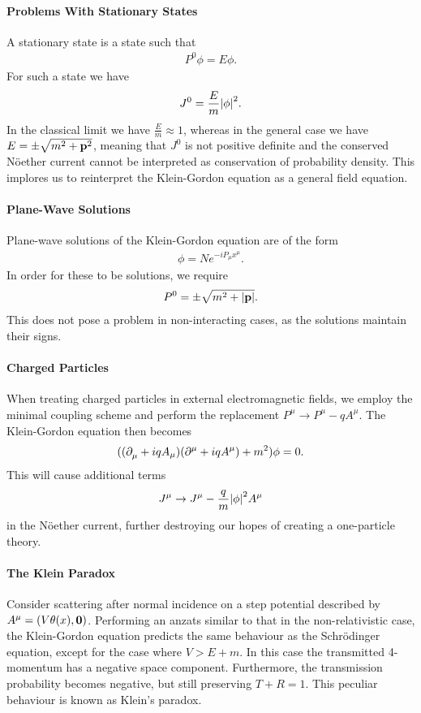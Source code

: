 \paragraph{Problems With Stationary States}
A stationary state is a state such that
\begin{align*}
	P^{0}\phi = E\phi.
\end{align*}
For such a state we have
\begin{align*}
	J^{0} = \frac{E}{m}\abs{\phi}^{2}.
\end{align*}
In the classical limit we have $\frac{E}{m} \approx 1$, whereas in the general case we have $E = \pm\sqrt{m^{2} + \vb{p}^{2}}$, meaning that $J^{0}$ is not positive definite and the conserved Nöether current cannot be interpreted as conservation of probability density. This implores us to reinterpret the Klein-Gordon equation as a general field equation.

\paragraph{Plane-Wave Solutions}
Plane-wave solutions of the Klein-Gordon equation are of the form
\begin{align*}
	\phi = Ne^{-iP_{\mu}x^{\mu}}.
\end{align*}
In order for these to be solutions, we require
\begin{align*}
	P^{0} = \pm\sqrt{m^{2} + \abs{\vb{p}}}.
\end{align*}
This does not pose a problem in non-interacting cases, as the solutions maintain their signs.

\paragraph{Charged Particles}
When treating charged particles in external electromagnetic fields, we employ the minimal coupling scheme and perform the replacement $P^{\mu}\to P^{\mu} - qA^{\mu}$. The Klein-Gordon equation then becomes
\begin{align*}
	((\partial^{}_{\mu}{} + iqA_{\mu})(\partial^{\mu}_{}{} + iqA^{\mu}) + m^{2})\phi = 0.
\end{align*}
This will cause additional terms
\begin{align*}
	J^{\mu} \to J^{\mu} - \frac{q}{m}\abs{\phi}^{2}A^{\mu}
\end{align*}
in the Nöether current, further destroying our hopes of creating a one-particle theory.

\paragraph{The Klein Paradox}
Consider scattering after normal incidence on a step potential described by $A^{\mu} = (V\theta(x), \vb{0})$. Performing an anzats similar to that in the non-relativistic case, the Klein-Gordon equation predicts the same behaviour as the Schrödinger equation, except for the case where $V > E + m$. In this case the transmitted 4-momentum has a negative space component. Furthermore, the transmission probability becomes negative, but still preserving $T + R = 1$. This peculiar behaviour is known as Klein's paradox.

